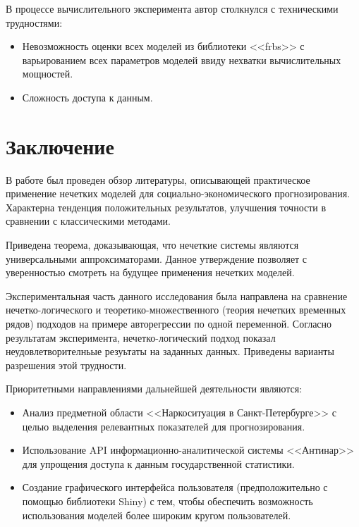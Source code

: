 \documentclass[a4paper,14pt]{article}
\begin{document}
В процессе вычислительного эксперимента автор столкнулся с техническими трудностями:
\begin{itemize}
	\item Невозможность оценки всех моделей из библиотеки <<frbs>> с варьированием всех параметров моделей ввиду нехватки вычислительных мощностей.
	\item Сложность доступа к данным.  
\end{itemize}
	


\newpage
\section*{Заключение}
В работе был проведен обзор литературы, описывающей практическое применение нечетких моделей для социально-экономического прогнозирования. Характерна тенденция положительных результатов, улучшения точности в сравнении с классическими методами.

Приведена теорема, доказывающая, что нечеткие системы являются универсальными аппроксиматорами. Данное утверждение позволяет с уверенностью смотреть на будущее применения нечетких моделей.

Экспериментальная часть данного исследования была направлена на сравнение нечетко-логического и теоретико-множественного (теория нечетких временных рядов) подходов на примере авторегрессии по одной переменной. Согласно результатам эксперимента, нечетко-логический подход показал неудовлетворителньые резуьтаты на заданных данных. Приведены варианты разрешения этой трудности.

Приоритетными направлениями дальнейшей деятельности являются:
\begin{itemize}
	\item Анализ предметной области <<Наркоситуация в Санкт-Петербурге>> с целью выделения релевантных показателей для прогнозирования.
	\item Использование API информационно-аналитической системы <<Антинар>> для упрощения доступа к данным государственной статистики.
	\item Создание графического интерфейса пользователя (предположительно с помощью библиотеки Shiny) с тем, чтобы обеспечить возможность использования моделей более широким кругом пользователей.
	 
	
\end{itemize}



\newpage
\printbibliography[heading=bibintoc]
\end{document}
